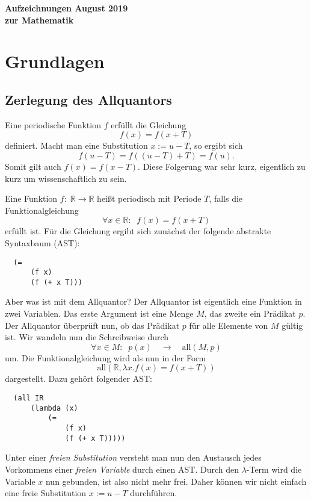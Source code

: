 \documentclass[a4paper,10pt,fleqn,twocolumn,twoside,dvipdfmx]{scrartcl}
\numberwithin{equation}{section}
\theoremstyle{rmbox}
\begin{document}
\noindent
{\LARGE\sffamily\bfseries Aufzeichnungen
{\mdseries\rmfamily\large\hfill August 2019}\\[-2pt]
zur Mathematik\par}


\tableofcontents

\section{Grundlagen}
\subsection{Zerlegung des Allquantors}
Eine periodische Funktion $f$ erfüllt die Gleichung
\begin{equation}
f(x) = f(x+T)
\end{equation}
definiert. Macht man eine Substitution $x:=u-T$, so ergibt sich
\begin{equation}
f(u-T) = f((u-T)+T) = f(u).
\end{equation}
Somit gilt auch $f(x)=f(x-T)$. Diese Folgerung war sehr kurz,
eigentlich zu kurz um wissenschaftlich zu sein.

Eine Funktion $f{:}\;\mathbb R\rightarrow\mathbb R$
heißt periodisch mit Periode $T$, falls die
Funktionalgleichung
\begin{equation}
\forall x{\in}\mathbb R{:}\;\; f(x) = f(x+T)
\end{equation}
erfüllt ist. Für die Gleichung ergibt sich zunächst
der folgende abstrakte Syntaxbaum (AST):
\begin{verbatim}
  (=
      (f x)
      (f (+ x T)))
\end{verbatim}
Aber was ist mit dem Allquantor? Der Allquantor ist eigentlich
eine Funktion in zwei Variablen. Das erste Argument ist eine Menge $M$,
das zweite ein Prädikat $p$. Der Allquantor überprüft nun, ob das
Prädikat $p$ für alle Elemente von $M$ gültig ist. Wir wandeln nun
die Schreibweise durch
\begin{equation}
\forall x{\in}M{:}\;\; p(x)\quad\longrightarrow\quad
\mathrm{all}(M,p)
\end{equation}
um. Die Funktionalgleichung wird als nun in der Form
\begin{equation}\label{periodisch-all}
\mathrm{all}(\mathbb R,\lambda x. f(x) = f(x+T))
\end{equation}
dargestellt. Dazu gehört folgender AST:
\begin{verbatim}
  (all IR
      (lambda (x)
          (=
              (f x)
              (f (+ x T)))))
\end{verbatim}
Unter einer \textit{freien Substitution} versteht man nun den
Austausch jedes Vorkommens einer \textit{freien Variable}
durch einen AST. Durch den $\lambda$-Term wird die
Variable $x$ nun gebunden, ist also nicht mehr frei.
Daher können wir nicht einfach eine freie Substitution
$x{:=}u{-}T$ durchführen.
\end{document}

